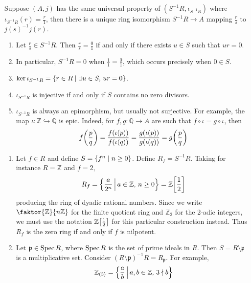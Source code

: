 \begin{proposition}
    Suppose \( (A, j) \) has the same universal property of \( (S^{-1}R, \iota_{S^{-1}R}) \) where \( \iota_{S^{-1}R}(r) = \frac{r}{1} \), then there is a unique ring isomorphism \( S^{-1}R \to A \) mapping \( \frac{r}{s} \) to \( j(s)^{-1} j(r) \).
\end{proposition}
\begin{remark}
    \begin{enumerate}
        \item Let \( \frac{r}{s} \in S^{-1}R \).
        Then \( \frac{r}{s} = \frac{0}{1} \) if and only if there exists \( u \in S \) such that \( ur = 0 \).
        \item In particular, \( S^{-1}R = 0 \) when \( \frac{1}{1} = \frac{0}{1} \), which occurs precisely when \( 0 \in S \).
        \item \( \ker \iota_{S^{-1}R} = \qty{r \in R \mid \exists u \in S,\, ur = 0} \).
        \item \( \iota_{S^{-1}R} \) is injective if and only if \( S \) contains no zero divisors.
        \item \( \iota_{S^{-1}R} \) is always an epimorphism, but usually not surjective.
        For example, the map \( \iota : \mathbb Z \hookrightarrow \mathbb Q \) is epic.
        Indeed, for \( f, g : \mathbb Q \to A \) are such that \( f \circ \iota = g \circ \iota \), then
        \[ f\qty(\frac{p}{q}) = \frac{f(\iota(p))}{f(\iota(q))} = \frac{g(\iota(p))}{g(\iota(q))} = g\qty(\frac{p}{q}) \]
    \end{enumerate}
\end{remark}
\begin{example}
    \begin{enumerate}
        \item Let \( f \in R \) and define \( S = \qty{f^n \mid n \geq 0} \).
        Define \( R_f = S^{-1}R \).
        Taking for instance \( R = \mathbb Z \) and \( f = 2 \),
        \[ R_f = \qty{\frac{a}{2^n} \,\middle|\,a \in \mathbb Z,\, n \geq 0} = \mathbb Z\qty[\frac{1}{2}] \]
        producing the ring of dyadic rational numbers.
        Since we write \( \faktor{\mathbb Z}{n\mathbb Z} \) for the finite quotient ring and \( \mathbb Z_2 \) for the 2-adic integers, we must use the notation \( \mathbb Z\qty[\frac{1}{2}] \) for this particular construction instead.
        Thus \( R_f \) is the zero ring if and only if \( f \) is nilpotent.
        \item Let \( \mathfrak p \in \operatorname{Spec} R \), where \( \operatorname{Spec} R \) is the set of prime ideals in \( R \).
        Then \( S = R \setminus \mathfrak p \) is a multiplicative set.
        Consider \( (R \setminus \mathfrak p)^{-1} R = R_{\mathfrak p} \).
        For example,
        \[ \mathbb Z_{(3)} = \qty{\frac{a}{b} \,\middle|\,a, b \in \mathbb Z,\, 3 \nmid b} \]
    \end{enumerate}
\end{example}

